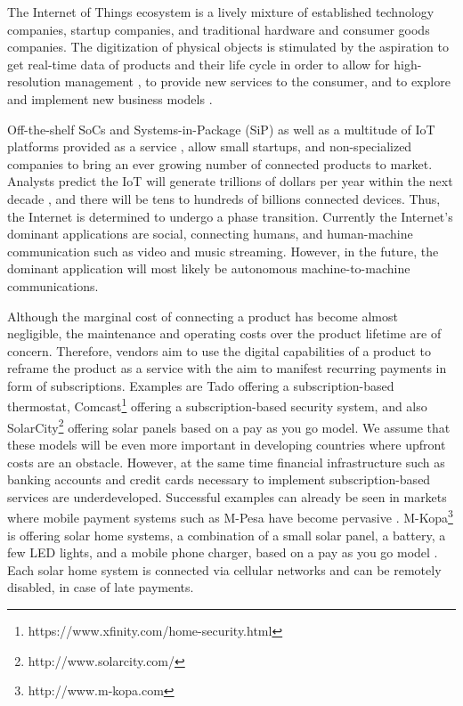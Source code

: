 The Internet of Things ecosystem is a lively mixture of established technology companies, startup companies, and traditional hardware and consumer goods companies. The digitization of physical objects is stimulated by the aspiration to get real-time data of products and their life cycle in order to allow for high-resolution management \parencite{fleisch2010internet}, to provide new services to the consumer, and to explore and implement new business models \parencite{Fleisch2015}.	

Off-the-shelf SoCs and Systems-in-Package (SiP) as well as a multitude of IoT platforms provided as a service \parencite{ISI:000379632700002}, allow small startups, and non-specialized companies to bring an ever growing number of connected products to market. Analysts predict the IoT will generate trillions of dollars per year within the next decade \parencite{manyika2015unlocking}, and there will be tens to hundreds of billions connected devices. Thus, the Internet is determined to undergo a phase transition. Currently the Internet's dominant applications are social, connecting humans, and human-machine communication such as video and music streaming. However, in the future, the dominant application will most likely be autonomous machine-to-machine communications. 

Although the marginal cost of connecting a product has become almost negligible, the maintenance and operating costs over the product lifetime are of concern. Therefore, vendors aim to use the digital capabilities of a product to reframe the product as a service with the aim to manifest recurring payments in form of subscriptions. Examples are Tado offering a subscription-based thermostat, Comcast\footnote{https://www.xfinity.com/home-security.html} offering a subscription-based security system, and also SolarCity\footnote{http://www.solarcity.com/} offering solar panels based on a pay as you go model. We assume that these models will be even more important in developing countries where upfront costs are an obstacle. However, at the same time financial infrastructure such as banking accounts and credit cards necessary to implement subscription-based services are underdeveloped. Successful examples can already be seen in markets where mobile payment systems such as M-Pesa have become pervasive \parencite{hughes2007m}. M-Kopa\footnote{http://www.m-kopa.com} is offering solar home systems, a combination of a small solar panel, a battery, a few LED lights, and a mobile phone charger, based on a pay as you go model \parencite{ISI:000351842100012}. Each solar home system is connected via cellular networks and can be remotely disabled, in case of late payments. 

